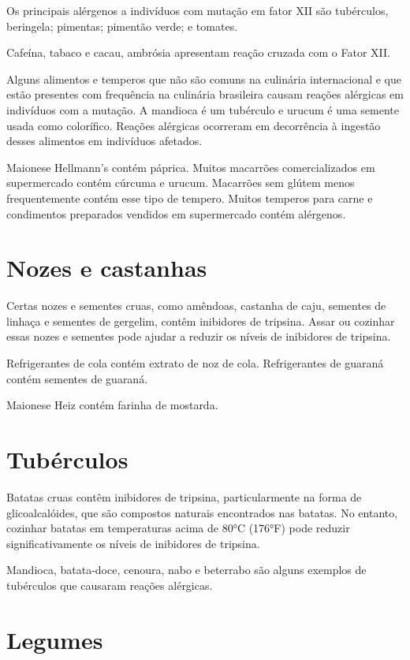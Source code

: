 \documentclass{article}
\begin{document}
Os principais alérgenos a indivíduos com mutação em fator XII são tubérculos, beringela; pimentas; pimentão verde; e tomates.

Cafeína, tabaco e cacau, ambrósia apresentam reação cruzada com o Fator XII.

Alguns alimentos e temperos que não são comuns na culinária internacional e
que estão presentes com frequência na culinária brasileira causam reações
alérgicas em indivíduos com a mutação. A mandioca é um tubérculo e urucum
é uma semente usada como colorífico. Reações alérgicas ocorreram em decorrência
à ingestão desses alimentos em indivíduos afetados.

Maionese Hellmann's contém páprica.
Muitos macarrões comercializados em supermercado contém cúrcuma e urucum.
Macarrões sem glútem menos frequentemente contém esse tipo de tempero.
Muitos temperos para carne e condimentos preparados vendidos em supermercado
contém alérgenos.

\section{Nozes e castanhas}

Certas nozes e sementes cruas, como amêndoas, castanha de caju, sementes de linhaça e sementes de gergelim, contêm inibidores de tripsina. Assar ou cozinhar essas nozes e sementes pode ajudar a reduzir os níveis de inibidores de tripsina.

Refrigerantes de cola contém extrato de noz de cola.
Refrigerantes de guaraná contém sementes de guaraná.

Maionese Heiz contém farinha de mostarda.

\section{Tubérculos}

Batatas cruas contêm inibidores de tripsina, particularmente na forma de glicoalcalóides, que são compostos naturais encontrados nas batatas. No entanto, cozinhar batatas em temperaturas acima de 80°C (176°F) pode reduzir significativamente os níveis de inibidores de tripsina.

Mandioca, batata-doce, cenoura, nabo e beterrabo são alguns exemplos de
tubérculos que causaram reações alérgicas.

\section{Legumes}
\end{document}
